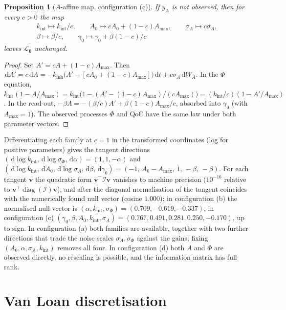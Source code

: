 \documentclass[12pt,a4paper]{article}
\theoremstyle{plain}
\newtheorem{proposition}[theorem]{Proposition}
\theoremstyle{definition}
\theoremstyle{remark}
\newcommand{\QoC}{\mathrm{QoC}}
\newcommand{\kinh}{k_{\mathrm{inh}}}
\newcommand{\kint}{k_{\mathrm{int}}}
\newcommand{\Amax}{A_{\max}}
\newcommand{\sA}{\sigma_{A}}
\newcommand{\sPhi}{\sigma_{\Phi}}
\renewcommand{\dd}{\,\mathrm{d}}   %
\newcommand{\diag}{\operatorname{diag}}
\newcommand{\thetav}{\boldsymbol{\theta}}
\begin{document}
\begin{proposition}[$A$-affine map, configuration (c)]
If $y_A$ is not observed, then for every $c>0$ the map
\begin{gather*}
\kint\mapsto\kint/c,\qquad A_0\mapsto cA_0+(1-c)\Amax,\qquad \sA\mapsto c\sA,\\
\beta\mapsto\beta/c,\qquad \gamma_0\mapsto\gamma_0+\beta(1-c)/c
\end{gather*}
leaves $\mathcal L_{\thetav}$ unchanged.
\end{proposition}
\begin{proof}
Set $A'=cA+(1-c)\Amax$. Then $\dd A'=c\dd A=-\kinh\bigl(A'-[cA_0+(1-c)\Amax]\bigr)\dd t+c\sA\dd W_A$. In the $\Phi$ equation, $\kint(1-A/\Amax)=\kint\bigl(1-(A'-(1-c)\Amax)/(c\Amax)\bigr)=(\kint/c)(1-A'/\Amax)$. In the read-out, $-\beta A=-(\beta/c)A'+\beta(1-c)\Amax/c$, absorbed into $\gamma_0$ (with $\Amax=1$). The observed processes $\Phi$ and $\QoC$ have the same law under both parameter vectors.
\end{proof}

Differentiating each family at $c=1$ in the transformed coordinates (log for positive parameters) gives the tangent directions $(\dd\log\kint,\dd\log\sPhi,\dd\alpha)=(1,1,-\alpha)$ and $(\dd\log\kint,\dd A_0,\dd\log\sA,\dd\beta,\dd\gamma_0)=(-1,\,A_0-\Amax,\,1,\,-\beta,\,-\beta)$. For each tangent $\mathbf v$ the quadratic form $\mathbf v^\top\mathcal I\mathbf v$ vanishes to machine precision ($10^{-16}$ relative to $\mathbf v^\top\diag(\mathcal I)\mathbf v$), and after the diagonal normalisation of  the tangent coincides with the numerically found null vector (cosine $1.000$): in configuration (b) the normalised null vector is $(\alpha,\kint,\sPhi)=(0.709,-0.619,-0.337)$, in configuration (c) $(\gamma_0,\beta,A_0,\kint,\sA)=(0.767,0.491,0.281,0.250,-0.170)$, up to sign. In configuration (a) both families are available, together with two further directions that trade the noise scales $\sA,\sPhi$ against the gains; fixing $(A_0,\alpha,\sA,\kint)$ removes all four. In configuration (d) both $A$ and $\Phi$ are observed directly, no rescaling is possible, and the information matrix has full rank.

\section{Van Loan discretisation}
\label{app:vanloan}
\end{document}
